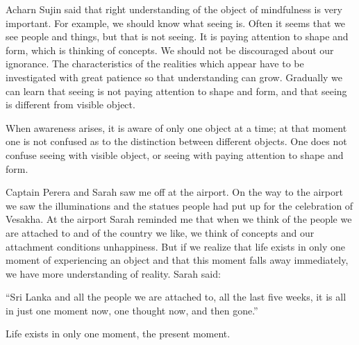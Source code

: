 Acharn Sujin said that right understanding of the object of mindfulness
is very important. For example, we should know what seeing is. Often it
seems that we see people and things, but that is not seeing. It is
paying attention to shape and form, which is thinking of concepts. We
should not be discouraged about our ignorance. The characteristics of
the realities which appear have to be investigated with great patience
so that understanding can grow. Gradually we can learn that seeing is
not paying attention to shape and form, and that seeing is different
from visible object.

When awareness arises, it is aware of only one object at a time; at that
moment one is not confused as to the distinction between different
objects. One does not confuse seeing with visible object, or seeing with
paying attention to shape and form.

Captain Perera and Sarah saw me off at the airport. On the way to the
airport we saw the illuminations and the statues people had put up for
the celebration of Vesakha. At the airport Sarah reminded me that when
we think of the people we are attached to and of the country we like, we
think of concepts and our attachment conditions unhappiness. But if we
realize that life exists in only one moment of experiencing an object
and that this moment falls away immediately, we have more understanding
of reality. Sarah said:

``Sri Lanka and all the people we are attached to, all the last five
weeks, it is all in just one moment now, one thought now, and then
gone.''

Life exists in only one moment, the present moment.




